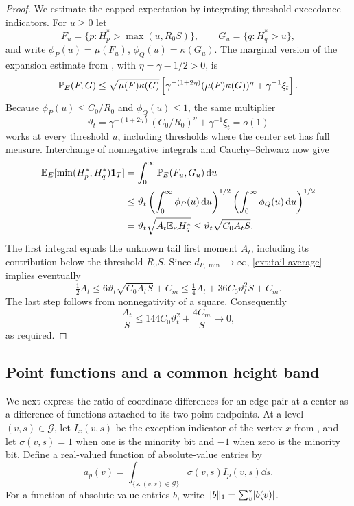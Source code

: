 \begin{proof}
We estimate the capped expectation by integrating threshold-exceedance indicators.  For \(u\ge0\) let
\[
 F_u=\{p:H_p^*>\max(u,R_0S)\},\qquad
 G_u=\{q:H_q^*>u\},
\]
and write \(\phi_P(u)=\mu(F_u)\), \(\phi_Q(u)=\kappa(G_u)\).
The marginal version of the expansion estimate from ,
with \(\eta=\gamma-1/2>0\), is
\[
 \mathbb P_E(F,G)\le\sqrt{\mu(F)\kappa(G)}
 \left[\gamma^{-(1+2\eta)}(\mu(F)\kappa(G))^\eta
                         +\gamma^{-1}\xi_t\right].
\]
Because \(\phi_P(u)\le C_0/R_0\) and \(\phi_Q(u)\le1\), the same multiplier
\[
 \vartheta_t=\gamma^{-(1+2\eta)}(C_0/R_0)^\eta
                      +\gamma^{-1}\xi_t=o(1)
\]
works at every threshold \(u\), including thresholds where the center set
has full measure.  Interchange of nonnegative integrals and Cauchy--Schwarz now give
\begin{align*}
 \mathbb E_E[\min(H_p^*,H_q^*)\mathbf1_T]
 &=\int_0^\infty\mathbb P_E(F_u,G_u)\,\mathrm d u\\
 &\le\vartheta_t
       \left(\int_0^\infty \phi_P(u)\,\mathrm d u\right)^{1/2}
       \left(\int_0^\infty \phi_Q(u)\,\mathrm d u\right)^{1/2}\\
 &=\vartheta_t\sqrt{A_t\mathbb E_\kappa H_q^*}
 \le\vartheta_t\sqrt{C_0A_tS}.
\end{align*}
The first integral equals the unknown tail first moment \(A_t\), including
its contribution below the threshold \(R_0S\).
Since \(d_{P,\min}\to\infty\), \eqref{ext:tail-average} implies eventually
\[
 \tfrac12 A_t\le6\vartheta_t\sqrt{C_0A_tS}+C_m
       \le\tfrac14 A_t+36C_0\vartheta_t^2S+C_m.
\]
The last step follows from nonnegativity of a square.  Consequently
\[
 \frac{A_t}{S}\le144C_0\vartheta_t^2+\frac{4C_m}{S}\longrightarrow0,
\]
as required.
\end{proof}

\subsection{Point functions and a common height band}

We next express the ratio of coordinate differences for an edge pair at a center as a difference of functions attached
to its two point endpoints.  At a level \((v,s)\in\mathcal G\), let
\(I_x(v,s)\) be the exception indicator of the vertex \(x\)
from , and let
\(\sigma(v,s)=1\) when one is the minority bit and \(-1\) when zero is
the minority bit.  Define a real-valued function of absolute-value entries by
\begin{equation}\label{ext:profile-definition}
 a_p(v)=\int_{\{s:(v,s)\in\mathcal G\}}
                       \sigma(v,s)I_p(v,s)\dd s.
\end{equation}
For a function of absolute-value entries \(b\), write \(\lVert b\rVert_1=\sum_v^*\lvert b(v)\rvert\).

